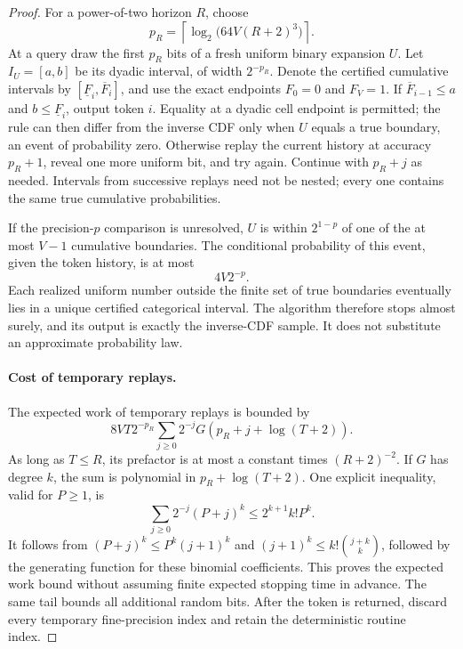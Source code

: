 \begin{proof}
For a power-of-two horizon $R$, choose
\[
 p_R=\left\lceil\log_2\bigl(64V(R+2)^3\bigr)\right\rceil.
\]
At a query draw the first $p_R$ bits of a fresh uniform binary
expansion $U$.  Let $I_U=[a,b]$ be its dyadic interval, of width
$2^{-p_R}$.  Denote the certified cumulative intervals by
$[\underline F_i,\overline F_i]$, and use the exact endpoints
$F_0=0$ and $F_V=1$.  If
$\overline F_{i-1}\le a$ and $b\le\underline F_i$, output
token $i$.  Equality at a dyadic cell endpoint is permitted; the
rule can then differ from the inverse CDF only when $U$ equals a
true boundary, an event of probability zero.  Otherwise
replay the current history at accuracy $p_R+1$, reveal one more
uniform bit, and try again.  Continue with $p_R+j$ as needed.
Intervals from successive replays need not be nested; every one
contains the same true cumulative probabilities.

If the precision-$p$ comparison is unresolved, $U$ is within
$2^{1-p}$ of one of the at most $V-1$ cumulative boundaries.
The conditional probability of this event, given the token
history, is at most
\begin{equation}
 4V2^{-p}.
 \label{eq:replayuncertainty}
\end{equation}
Each realized uniform number outside the finite set of true
boundaries eventually lies in a unique certified categorical
interval.  The algorithm therefore stops almost surely, and its
output is exactly the inverse-CDF sample.  It does not substitute
an approximate probability law.

\paragraph{Cost of temporary replays.}
The expected work of temporary replays is bounded by
\[
 8VT2^{-p_R}
 \sum_{j\ge0}2^{-j}G(p_R+j+\log(T+2)).
\]
As long as $T\le R$, its prefactor is at most a constant times
$(R+2)^{-2}$.  If $G$ has degree $k$, the sum is polynomial
in $p_R+\log(T+2)$.  One explicit inequality, valid for $P\ge1$,
is
\[
 \sum_{j\ge0}2^{-j}(P+j)^k
 \le2^{k+1}k!P^k.
\]
It follows from $(P+j)^k\le P^k(j+1)^k$ and
$(j+1)^k\le k!\binom{j+k}{k}$, followed by the generating
function for these binomial coefficients.  This proves the
expected work bound without assuming finite expected stopping
time in advance.  The same tail bounds all additional random
bits.  After the token is returned, discard every temporary
fine-precision index and retain the deterministic routine index.


\end{proof}
